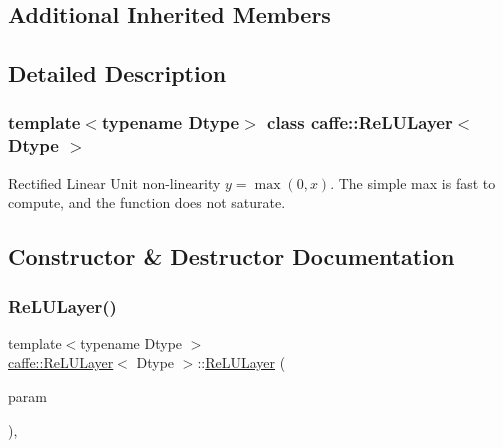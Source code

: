 \subsection*{Additional Inherited Members}


\subsection{Detailed Description}
\subsubsection*{template$<$typename Dtype$>$\newline
class caffe\+::\+Re\+L\+U\+Layer$<$ Dtype $>$}

Rectified Linear Unit non-\/linearity $ y = \max(0, x) $. The simple max is fast to compute, and the function does not saturate. 

\subsection{Constructor \& Destructor Documentation}
\mbox{\label{classcaffe_1_1_re_l_u_layer_aa6770fbbfd5e6f564c2ca19de7f7e712}} 
\subsubsection{\texorpdfstring{Re\+L\+U\+Layer()}{ReLULayer()}\hspace{0.1cm}{\footnotesize\ttfamily [1/2]}}
{\footnotesize\ttfamily template$<$typename Dtype $>$ \\
\mbox{\hyperlink{classcaffe_1_1_re_l_u_layer}{caffe\+::\+Re\+L\+U\+Layer}}$<$ Dtype $>$\+::\mbox{\hyperlink{classcaffe_1_1_re_l_u_layer}{Re\+L\+U\+Layer}} (\begin{DoxyParamCaption}\item[{const \mbox{\hyperlink{classcaffe_1_1_layer_parameter}{Layer\+Parameter}} \&}]{param }\end{DoxyParamCaption})\hspace{0.3cm}{\ttfamily [inline]}, {\ttfamily [explicit]}}


